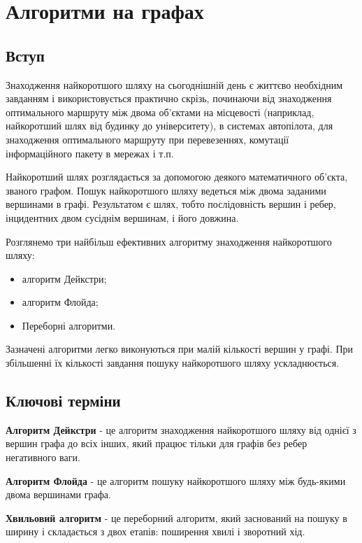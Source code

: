 \chapter{Алгоритми на графах}
\nopagebreak[4]

\section{Вступ}
\nopagebreak[4]
Знаходження найкоротшого шляху на сьогоднішній день є життєво необхідним завданням і використовується практично скрізь, починаючи від знаходження оптимального маршруту між двома об'єктами на місцевості (наприклад, найкоротший шлях від будинку до університету), в системах автопілота, для знаходження оптимального маршруту при перевезеннях, комутації інформаційного пакету в мережах і т.п.

Найкоротший шлях розглядається за допомогою деякого математичного об'єкта, званого графом. Пошук найкоротшого шляху ведеться між двома заданими вершинами в графі. Результатом є шлях, тобто послідовність вершин і ребер, інцидентних двом сусіднім вершинам, і його довжина.

Розглянемо три найбільш ефективних алгоритму знаходження найкоротшого шляху:

\begin{itemize}
\item алгоритм Дейкстри;
\item алгоритм Флойда;
\item Переборні алгоритми. 
\end{itemize}

Зазначені алгоритми легко виконуються при малій кількості вершин у графі. При збільшенні їх кількості завдання пошуку найкоротшого шляху ускладнюється. 




\section{Ключові терміни}
\nopagebreak[4]
\textbf{Алгоритм Дейкстри} - це алгоритм знаходження найкоротшого шляху від однієї з вершин графа до всіх інших, який працює тільки для графів без ребер негативного ваги.

\textbf{Алгоритм Флойда} - це алгоритм пошуку найкоротшого шляху між будь-якими двома вершинами графа.

\textbf{Хвильовий алгоритм} - це переборний алгоритм, який заснований на пошуку в ширину і складається з двох етапів: поширення хвилі і зворотний хід.


